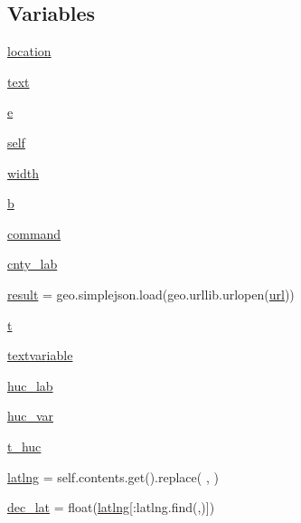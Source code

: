 \subsection*{Variables}
\begin{DoxyCompactItemize}
\item 
\hyperlink{namespaceget__geo___h_u_c_a7592d1dc926835f8c651c5761a3cf94a}{location}
\item 
\hyperlink{namespaceget__geo___h_u_c_ada77bf554a2fd51d028bc3830983b8b6}{text}
\item 
\hyperlink{namespaceget__geo___h_u_c_aa7eddbf5988aec86b6750fa36bf532be}{e}
\item 
\hyperlink{namespaceget__geo___h_u_c_a5d34137420af63fc8dd32374dead14a8}{self}
\item 
\hyperlink{namespaceget__geo___h_u_c_ad4f932dfe1b13e5124bc8be92dfb1f07}{width}
\item 
\hyperlink{namespaceget__geo___h_u_c_a6756d51ec2f6d391eddbc37c88a3369c}{b}
\item 
\hyperlink{namespaceget__geo___h_u_c_a8aad6d9263e79de308254e23bad82c50}{command}
\item 
\hyperlink{namespaceget__geo___h_u_c_a49b3d33e0540c2e2f9e991370aae8f8e}{cnty\+\_\+lab}
\item 
\hyperlink{namespaceget__geo___h_u_c_a3cbe3b2d0670a061bbc0c7be84c34d33}{result} = geo.\+simplejson.\+load(geo.\+urllib.\+urlopen(\hyperlink{namespaceget__geo___h_u_c_ab6098a8720c14d3cf3f34a3301c2ca93}{url}))
\item 
\hyperlink{namespaceget__geo___h_u_c_a5e43010bf41ec0eb1eb43403e310e26e}{t}
\item 
\hyperlink{namespaceget__geo___h_u_c_ac67b3377ef85a8077485ef5ae2c64c59}{textvariable}
\item 
\hyperlink{namespaceget__geo___h_u_c_adae93ea1e2d42a6d3c9992ae2e2277a0}{huc\+\_\+lab}
\item 
\hyperlink{namespaceget__geo___h_u_c_a68717ed78e37a7292f01cf4e97c95e9f}{huc\+\_\+var}
\item 
\hyperlink{namespaceget__geo___h_u_c_a0ac336639aa6dc23f2920f162311021b}{t\+\_\+huc}
\item 
\hyperlink{namespaceget__geo___h_u_c_acafcc8295c3d6a0de2fb561809cca132}{latlng} = self.\+contents.\+get().replace(\textquotesingle{} \textquotesingle{}, \textquotesingle{}\textquotesingle{})
\item 
\hyperlink{namespaceget__geo___h_u_c_a299ab467b6f9c8780c7b107ebf7681f3}{dec\+\_\+lat} = float(\hyperlink{namespaceget__geo___h_u_c_acafcc8295c3d6a0de2fb561809cca132}{latlng}\mbox{[}\+:latlng.\+find(\textquotesingle{},\textquotesingle{})\mbox{]})

\end{DoxyCompactItemize}
